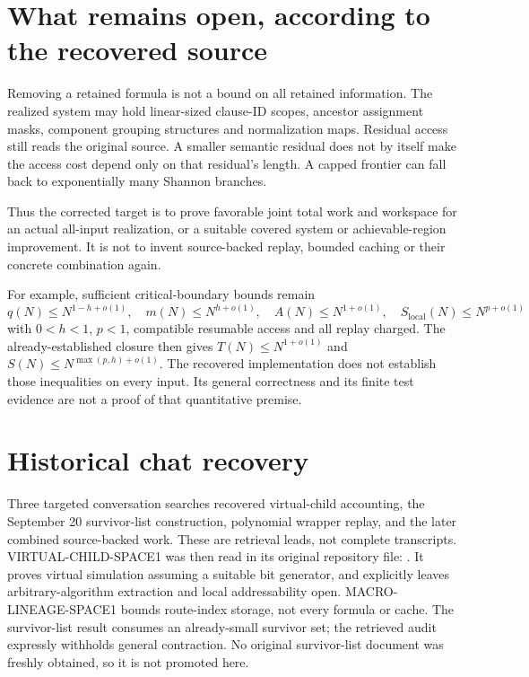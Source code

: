 \documentclass[11pt]{article}
\begin{document}
\section{What remains open, according to the recovered source}
Removing a retained formula is not a bound on all retained information.
The realized system may hold linear-sized clause-ID scopes, ancestor
assignment masks, component grouping structures and normalization maps.
Residual access still reads the original source. A smaller semantic residual
does not by itself make the access cost depend only on that residual's length.
A capped frontier can fall back to exponentially many Shannon branches.

Thus the corrected target is to prove favorable joint total work and
workspace for an actual all-input realization, or a suitable covered system
or achievable-region improvement. It is not to invent source-backed replay,
bounded caching or their concrete combination again.

For example, sufficient critical-boundary bounds remain
\[
q(N)\le N^{1-h+o(1)},\quad
m(N)\le N^{h+o(1)},\quad
A(N)\le N^{1+o(1)},\quad S_{\mathrm{local}}(N)\le N^{p+o(1)}
\]
with $0<h<1$, $p<1$, compatible resumable access and all replay charged.
The already-established closure then gives
$T(N)\le N^{1+o(1)}$ and
$S(N)\le N^{\max(p,h)+o(1)}$.
The recovered implementation does not establish those inequalities on every
input. Its general correctness and its finite test evidence are not a proof
of that quantitative premise.

\section{Historical chat recovery}
Three targeted conversation searches recovered virtual-child accounting,
the September 20 survivor-list construction, polynomial wrapper replay,
and the later combined source-backed work. These are retrieval leads,
not complete transcripts.
VIRTUAL-CHILD-SPACE1 was then read in its original repository file:
.
It proves virtual simulation assuming a suitable bit generator, and explicitly
leaves arbitrary-algorithm extraction and local addressability open.
MACRO-LINEAGE-SPACE1 bounds route-index storage, not every formula or cache.
The survivor-list result consumes an already-small survivor set; the retrieved
audit expressly withholds general contraction. No original survivor-list
document was freshly obtained, so it is not promoted here.
\end{document}
